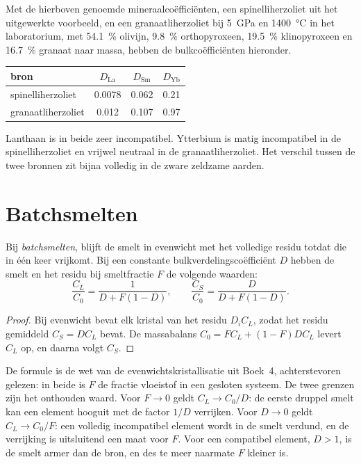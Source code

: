 Met de hierboven genoemde mineraalcoëfficiënten, een spinelliherzoliet uit het uitgewerkte
voorbeeld, en een granaatliherzoliet bij \qty{5}{GPa} en
\qty{1400}{\celsius} in het laboratorium, met \qty{54.1}{\percent} olivijn,
\qty{9.8}{\percent} orthopyroxeen, \qty{19.5}{\percent} klinopyroxeen en
\qty{16.7}{\percent} granaat naar massa, hebben de bulkcoëfficiënten hieronder.
\begin{center}
\small
\begin{tabular}{lccc}
\hline
bron & $D_{\mathrm{La}}$ & $D_{\mathrm{Sm}}$ & $D_{\mathrm{Yb}}$ \\
\hline
spinelliherzoliet & 0.0078 & 0.062 & 0.21 \\
granaatliherzoliet & 0.012 & 0.107 & 0.97 \\
\hline
\end{tabular}
\end{center}
Lanthaan is in beide zeer incompatibel. Ytterbium is matig incompatibel
in de spinelliherzoliet en vrijwel neutraal in de granaatliherzoliet. Het
verschil tussen de twee bronnen zit bijna volledig in de zware zeldzame
aarden.

\section{Batchsmelten}\label{sec:b3:trace-element-modelling:batch}

\begin{theorem}[Batchsmelten]\label{thm:b3:trace-element-modelling:batch}
Bij \emph{batchsmelten}, blijft de smelt in evenwicht
met het volledige residu totdat die in één keer vrijkomt. Bij een constante bulkverdelingscoëfficiënt
$D$ hebben de smelt en het residu bij smeltfractie $F$ de
volgende waarden:
\[
\frac{C_L}{C_0} = \frac{1}{D + F(1 - D)}, \qquad
\frac{C_S}{C_0} = \frac{D}{D + F(1 - D)}.
\]
\end{theorem}

\begin{proof}
Bij evenwicht bevat elk kristal van het residu $D_iC_L$, zodat het residu
gemiddeld $C_S = DC_L$ bevat. De massabalans $C_0 = FC_L + (1 - F)DC_L$ levert
$C_L$ op, en daarna volgt $C_S$.
\end{proof}

De formule is de wet van de evenwichtskristallisatie uit Boek~4, achterstevoren
gelezen: in beide is $F$ de fractie vloeistof in een gesloten systeem. De
twee grenzen zijn het onthouden waard. Voor $F \to 0$ geldt $C_L \to C_0/D$: de eerste druppel smelt
kan een element hooguit met de factor $1/D$ verrijken. Voor $D \to 0$ geldt $C_L \to
C_0/F$: een volledig incompatibel element wordt in de smelt verdund, en de
verrijking is uitsluitend een maat voor $F$. Voor een compatibel element, $D > 1$, is de smelt
armer dan de bron, en des te meer naarmate $F$ kleiner is.


